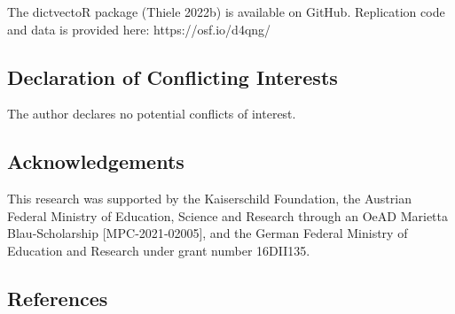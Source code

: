 \documentclass[
]{ccr}
\begin{document}
The dictvectoR package (Thiele 2022b) is available on GitHub.
Replication code and data is provided here: https://osf.io/d4qng/

\hypertarget{declaration-of-conflicting-interests}{%
\subsection{Declaration of Conflicting
Interests}\label{declaration-of-conflicting-interests}}

The author declares no potential conflicts of interest.

\hypertarget{acknowledgements}{%
\subsection{Acknowledgements}\label{acknowledgements}}

This research was supported by the Kaiserschild Foundation, the Austrian
Federal Ministry of Education, Science and Research through an OeAD
Marietta Blau‐Scholarship {[}MPC‐2021‐02005{]}, and the German Federal
Ministry of Education and Research under grant number 16DII135.

\hypertarget{references}{%
\subsection{References}\label{references}}
\end{document}
